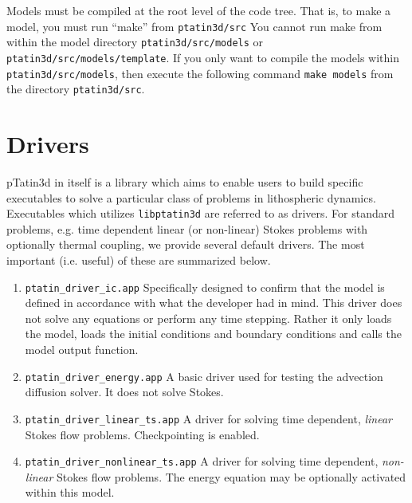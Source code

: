 \documentclass[paper=a4, fontsize=11pt,twoside]{scrartcl}
\newcommand{\ptat}{{pTatin3d}}
\newcommand{\unix}[1]{\texttt{\footnotesize #1}}
\begin{document}
{{Models must be compiled at the root level of the code tree.
That is, to make a model, you must run ``make'' from 
	\unix{ptatin3d/src}
You cannot run make from within the model directory
	\unix{ptatin3d/src/models}
or
	\unix{ptatin3d/src/models/template}.
If you only want to compile the models within
	\unix{ptatin3d/src/models},
then execute the following command
	\unix{make models}
from the directory
	\unix{ptatin3d/src}.


\newpage
\section{Drivers}
{\ptat} in itself is a library which aims to enable users to build specific executables to solve a particular class of problems in lithospheric dynamics.
Executables which utilizes \unix{libptatin3d} are referred to as drivers.
For standard problems, e.g. time dependent linear (or non-linear) Stokes problems with optionally thermal coupling, we provide several default drivers.
The most important (i.e. useful) of these are summarized below.

\begin{enumerate}
	\item \unix{ptatin\_driver\_ic.app}
	Specifically designed to confirm that the model is defined in accordance with what the developer had in mind. This driver does not solve any equations or perform any time stepping. Rather it only loads the model, loads the initial conditions and boundary conditions and calls the model output function.
	
	\item \unix{ptatin\_driver\_energy.app}
	A basic driver used for testing the advection diffusion solver. It does not solve Stokes.
	
	\item \unix{ptatin\_driver\_linear\_ts.app}
	A driver for solving time dependent, {\it linear} Stokes flow problems. Checkpointing is enabled.

	\item \unix{ptatin\_driver\_nonlinear\_ts.app}
	A driver for solving time dependent, {\it non-linear} Stokes flow problems. The energy equation may be optionally activated within this model.
\end{enumerate}

}}
\end{document}
